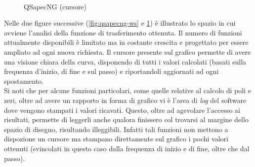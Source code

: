 \begin{figure}[ht]
 \centering
 \\
 \caption{QSapecNG (cursore)}
 \label{fig:qsapecng-cur}
\end{figure}

Nelle due figure successive (\ref{fig:qsapecng-ws} e \ref{fig:qsapecng-cur}) è illustrato lo spazio in cui avviene l'analisi della funzione di trasferimento ottenuta. Il numero di funzioni attualmente disponibili è limitato ma in costante crescita e progettato per essere ampliato ad ogni nuova richiesta. Il cursore presente sul grafico permette di avere una visione chiara della curva, disponendo di tutti i valori calcolati (basati sulla frequenza d'inizio, di fine e sul passo) e riportandoli aggiornati ad ogni spostamento.\\
Si noti che per alcune funzioni particolari, come quelle relative al calcolo di poli e zeri, oltre ad avere un rapporto in forma di grafico vi è l'area di \textit{log} del software dove vengono stampati i valori ricavati. Questo, oltre ad agevolare l'accesso ai risultati, permette di leggerli anche qualora finissero col trovarsi al margine dello spazio di disegno, risultando illeggibili. Infatti tali funzioni non mettono a dispozione un cursore ma stampano direttamente sul grafico i pochi valori ottenuti (svincolati in questo caso dalla frequenza di inizio e di fine, oltre che dal passo).

